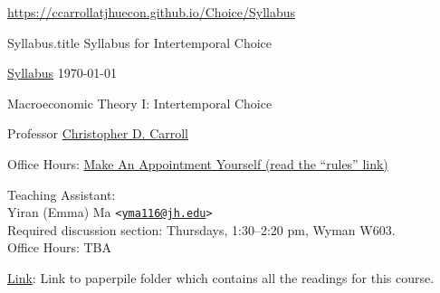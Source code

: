 \documentclass{\econtex}\newcommand{\texname}{Syllabus}
\begin{document}
\large
\begin{center}{{\tiny \url{https://ccarrollatjhuecon.github.io/Choice/Syllabus}}}\end{center}

\begin{verbatimwrite}{\texname.title}
Syllabus for Intertemporal Choice
\end{verbatimwrite}

\thispagestyle{empty}

\newenvironment{blockpar}{\par\begin{minipage}{\textwidth}
\setlength{\parskip}{.5\baselineskip plus 1pt minus 1pt}}{\end{minipage}}

\pagestyle{plain}
\thispagestyle{empty}

\begin{center}
{\tiny \href{https://ccarrollatjhuecon.github.io/Choice/Syllabus}{\texname} \hfill \today}

{\LARGE Macroeconomic Theory I: Intertemporal Choice}
\medskip\medskip\medskip\medskip

\smallskip

Professor \href{http://www.econ2.jhu.edu/people/ccarroll}{Christopher D. Carroll}

\medskip

\medskip\medskip
Office Hours: \href{https://calendar.google.com/calendar/selfsched?sstoken=UUNxMjFfNUtvakNSfGRlZmF1bHR8NjZhZDA0NmI3YmE5N2Y5N2Y3YjE2MzI5ZDg5YTYwYjQ}{Make An Appointment Yourself (read the ``rules'' link)}

\medskip\medskip\medskip
\small
Teaching Assistant:  \\
Yiran (Emma) Ma \texttt{<\href{mailto:yma116@jh.edu}{\texttt{yma116@jh.edu}}>}
\\ Required discussion section: Thursdays, 1:30--2:20 pm, Wyman W603.
\\ Office Hours: TBA
\normalsize
\medskip

\small
\href{https://app.paperpile.com/econark-related-tkUex~5rSTa26MXwWY5FtZQ/all}{Link}: Link to paperpile folder which contains all the readings for this course.

\end{center}
\end{document}
